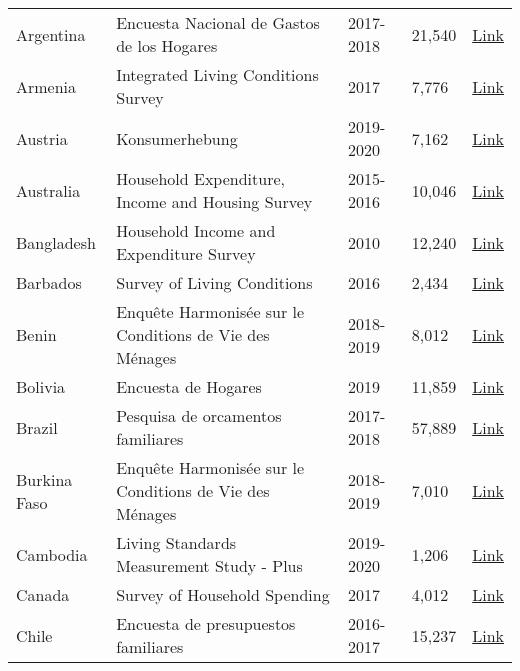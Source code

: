\begin{ThreePartTable}
\begin{longtable}[t]{l|p{8cm}|l|l|l}
        Argentina & Encuesta Nacional de Gastos de los Hogares & 2017-2018 &  21,540  & \href{https://www.indec.gob.ar/indec/web/Nivel4-Tema-4-45-151}{Link} \\ 
        Armenia & Integrated Living Conditions Survey & 2017 &  7,776  & \href{https://microdata.worldbank.org/index.php/catalog/3591}{Link} \\ 
        Austria & Konsumerhebung & 2019-2020 &  7,162  & \href{https://www.statistik.at/ueber-uns/erhebungen/personen-und-haushaltserhebungen/konsumerhebung}{Link} \\ 
        Australia & Household Expenditure, Income and Housing Survey & 2015-2016 & 10,046 & \href{https://www.abs.gov.au/AUSSTATS/abs@.nsf/Lookup/6503.0Main+Features12015-16?OpenDocument}{Link}  \\
        Bangladesh & Household Income and Expenditure Survey & 2010 &  12,240  & \href{http://data.bbs.gov.bd/index.php/catalog/67}{Link} \\ 
        Barbados & Survey of Living Conditions & 2016 &  2,434  & \href{https://publications.iadb.org/en/barbados-survey-living-conditions-2016}{Link} \\ 
        Benin & Enquête Harmonisée sur le Conditions de Vie des Ménages & 2018-2019 &  8,012  & \href{https://microdata.worldbank.org/index.php/catalog/4291}{Link} \\ 
        Bolivia & Encuesta de Hogares & 2019 &  11,859  & \href{https://www.ine.gob.bo/index.php/estadisticas-sociales/vivienda-y-servicios-basicos/encuestas-de-hogares-vivienda/}{Link} \\ 
        Brazil & Pesquisa de orcamentos familiares & 2017-2018 &  57,889  & \href{https://www.ibge.gov.br/en/statistics/social/population/25610-pof-2017-2018-pof-en.html?=\&t=downloads}{Link} \\ 
        Burkina Faso & Enquête Harmonisée sur le Conditions de Vie des Ménages & 2018-2019 &  7,010  & \href{https://microdata.worldbank.org/index.php/catalog/4290}{Link} \\ 
        Cambodia & Living Standards Measurement Study - Plus & 2019-2020 &  1,206  & \href{https://microdata.worldbank.org/index.php/catalog/study/KHM\_2019\_LSMS-PLUS\_v02\_M}{Link} \\ 
        Canada & Survey of Household Spending & 2017 &  4,012  & \href{https://www150.statcan.gc.ca/n1/en/catalogue/62M0004X}{Link} \\ 
        Chile & Encuesta de presupuestos familiares & 2016-2017 &  15,237  & \href{https://www.ine.cl/estadisticas/sociales/ingresos-y-gastos/encuesta-de-presupuestos-familiares}{Link} \\ 

\end{longtable}
\end{ThreePartTable}
